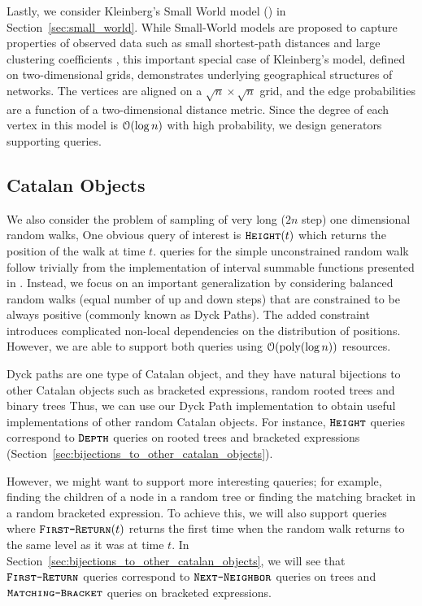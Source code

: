 Lastly, we consider Kleinberg's Small World model (\cite{kleinberg, klein}) in Section~\ref{sec:small_world}.
While Small-World models are proposed to capture 
properties of observed data such as small shortest-path 
distances and large clustering coefficients \cite{watts1998collective}, 
this important special case of Kleinberg's model, defined on two-dimensional grids, 
demonstrates underlying geographical structures of networks. 
The vertices are aligned on a $\sqrt{n}\times\sqrt{n}$ grid,
and the edge probabilities are a function of a two-dimensional distance metric.
Since the degree of each vertex in this model is $\Bo(\log n)$ with high probability,
we design generators supporting  queries.




\subsection{Catalan Objects}%
\label{sec:catalan_objects}
We also consider the problem of sampling of very long ($2n$ step) one dimensional random walks,
One obvious query of interest is $\texttt{\textsc{Height}}(t)$ which returns the position of the walk at time $t$.
 queries for the simple unconstrained random walk
follow trivially from the implementation of interval summable functions presented in \cite{huge}.
Instead, we focus on an important generalization by considering balanced random walks (equal number of up and down steps)
that are constrained to be always positive (commonly known as Dyck Paths).
The added constraint introduces complicated non-local dependencies on the distribution of positions.
However, we are able to support both queries using $\mathcal O(\mathrm{poly}(\log n))$ resources.

Dyck paths are one type of Catalan object, and they have natural bijections to other Catalan objects
such as bracketed expressions, random rooted trees and binary trees
Thus, we can use our Dyck Path implementation to obtain useful implementations of other random Catalan objects.
For instance, $\texttt{\textsc{Height}}$ queries correspond to $\texttt{\textsc{Depth}}$ queries on rooted trees and bracketed expressions
(Section~\ref{sec:bijections_to_other_catalan_objects}).

However, we might want to support more interesting qaueries; for example,
finding the children of a node in a random tree or finding the matching bracket in a random bracketed expression.
To achieve this, we will also support  queries
where $\texttt{\textsc{First-Return}}(t)$ returns the first time when the random walk returns to the same level as it was at time $t$.
In Section~\ref{sec:bijections_to_other_catalan_objects}, we will see that $\texttt{\textsc{First-Return}}$ queries correspond to
$\texttt{\textsc{Next-Neighbor}}$ queries on trees and $\texttt{\textsc{Matching-Bracket}}$ queries on bracketed expressions.





